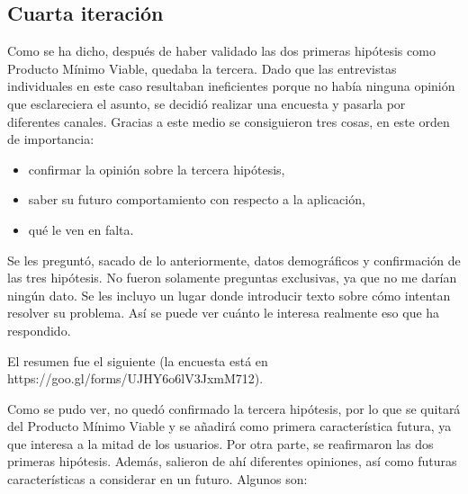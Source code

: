 
\subsection{Cuarta iteración}

Como se ha dicho, después de haber validado las dos primeras hipótesis como Producto Mínimo Viable, quedaba la tercera. Dado que las entrevistas individuales en este caso resultaban ineficientes porque no había ninguna opinión que esclareciera el asunto, se decidió realizar una encuesta y pasarla por diferentes canales. Gracias a este medio se consiguieron tres cosas, en este orden de importancia:

\begin{itemize}
    \item confirmar la opinión sobre la tercera hipótesis,
    \item saber su futuro comportamiento con respecto a la aplicación,
    \item qué le ven en falta.
\end{itemize}

Se les preguntó, sacado de lo anteriormente, datos demográficos y confirmación de las tres hipótesis. No fueron solamente preguntas exclusivas, ya que no me darían ningún dato. Se les incluyo un lugar donde introducir texto sobre cómo intentan resolver su problema. Así se puede ver cuánto le interesa realmente eso que ha respondido.

El resumen fue el siguiente (la encuesta está en https://goo.gl/forms/UJHY6o6lV3JxmM712).



Como se pudo ver, no quedó confirmado la tercera hipótesis, por lo que se quitará del Producto Mínimo Viable y se añadirá como primera característica futura, ya que interesa a la mitad de los usuarios. Por otra parte, se reafirmaron las dos primeras hipótesis. Además, salieron de ahí diferentes opiniones, así como futuras características a considerar en un futuro. Algunos son:

